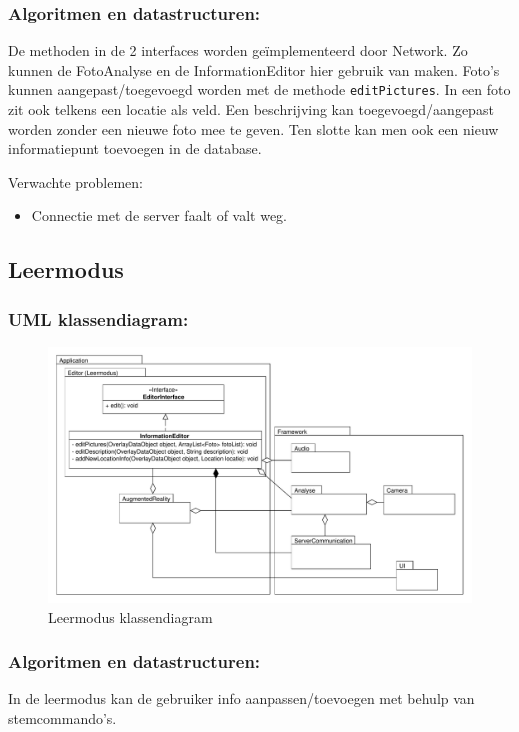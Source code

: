 \documentclass[12pt,a4paper,oneside]{article}
\begin{document}
\subsubsection*{Algoritmen en datastructuren:}
De methoden in de 2 interfaces worden ge\"implementeerd door Network. Zo kunnen de FotoAnalyse en de InformationEditor hier gebruik van maken.
Foto's kunnen aangepast/toegevoegd worden met de methode \verb$editPictures$. In een foto zit ook telkens een locatie als veld.
Een beschrijving kan toegevoegd/aangepast worden zonder een nieuwe foto mee te geven.
Ten slotte kan men ook een nieuw informatiepunt toevoegen in de database.
\par 
Verwachte problemen:
\begin{itemize}
\item Connectie met de server faalt of valt weg.
\end{itemize}
\subsection{Leermodus}
\subsubsection*{UML klassendiagram:}
\begin{figure}[H]
  \begin{center}
    \includegraphics[scale=0.5]{Leermodus.pdf}
    \caption{Leermodus klassendiagram}
    \label{graph:graph2}
  \end{center}
\end{figure}
\subsubsection*{Algoritmen en datastructuren:}
In de leermodus kan de gebruiker info aanpassen/toevoegen met behulp van stemcommando's.\\
\end{document}
